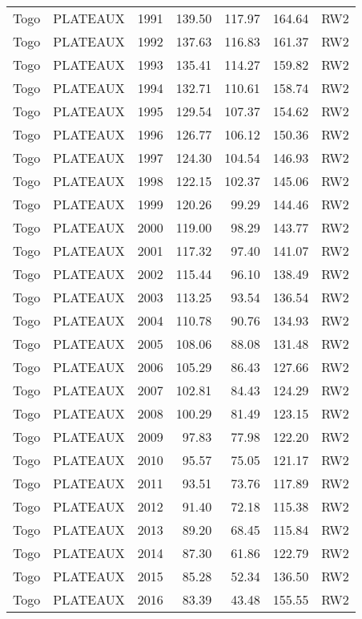 \begin{longtable}{lllrrrl}
  Togo & PLATEAUX & 1991 & 139.50 & 117.97 & 164.64 & RW2 \\ 
  Togo & PLATEAUX & 1992 & 137.63 & 116.83 & 161.37 & RW2 \\ 
  Togo & PLATEAUX & 1993 & 135.41 & 114.27 & 159.82 & RW2 \\ 
  Togo & PLATEAUX & 1994 & 132.71 & 110.61 & 158.74 & RW2 \\ 
  Togo & PLATEAUX & 1995 & 129.54 & 107.37 & 154.62 & RW2 \\ 
  Togo & PLATEAUX & 1996 & 126.77 & 106.12 & 150.36 & RW2 \\ 
  Togo & PLATEAUX & 1997 & 124.30 & 104.54 & 146.93 & RW2 \\ 
  Togo & PLATEAUX & 1998 & 122.15 & 102.37 & 145.06 & RW2 \\ 
  Togo & PLATEAUX & 1999 & 120.26 & 99.29 & 144.46 & RW2 \\ 
  Togo & PLATEAUX & 2000 & 119.00 & 98.29 & 143.77 & RW2 \\ 
  Togo & PLATEAUX & 2001 & 117.32 & 97.40 & 141.07 & RW2 \\ 
  Togo & PLATEAUX & 2002 & 115.44 & 96.10 & 138.49 & RW2 \\ 
  Togo & PLATEAUX & 2003 & 113.25 & 93.54 & 136.54 & RW2 \\ 
  Togo & PLATEAUX & 2004 & 110.78 & 90.76 & 134.93 & RW2 \\ 
  Togo & PLATEAUX & 2005 & 108.06 & 88.08 & 131.48 & RW2 \\ 
  Togo & PLATEAUX & 2006 & 105.29 & 86.43 & 127.66 & RW2 \\ 
  Togo & PLATEAUX & 2007 & 102.81 & 84.43 & 124.29 & RW2 \\ 
  Togo & PLATEAUX & 2008 & 100.29 & 81.49 & 123.15 & RW2 \\ 
  Togo & PLATEAUX & 2009 & 97.83 & 77.98 & 122.20 & RW2 \\ 
  Togo & PLATEAUX & 2010 & 95.57 & 75.05 & 121.17 & RW2 \\ 
  Togo & PLATEAUX & 2011 & 93.51 & 73.76 & 117.89 & RW2 \\ 
  Togo & PLATEAUX & 2012 & 91.40 & 72.18 & 115.38 & RW2 \\ 
  Togo & PLATEAUX & 2013 & 89.20 & 68.45 & 115.84 & RW2 \\ 
  Togo & PLATEAUX & 2014 & 87.30 & 61.86 & 122.79 & RW2 \\ 
  Togo & PLATEAUX & 2015 & 85.28 & 52.34 & 136.50 & RW2 \\ 
  Togo & PLATEAUX & 2016 & 83.39 & 43.48 & 155.55 & RW2 \\ 

\end{longtable}
